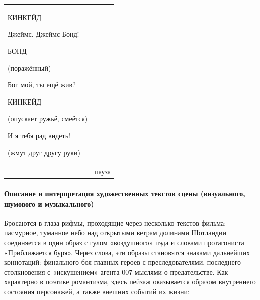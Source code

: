 \begin{center}
\begin{longtable}{|p{}|p{}|}
\begin{center}КИНКЕЙД\end{center} \newline
Джеймс. Джеймс Бонд! \newline
\begin{center}БОНД\end{center} \newline
\begin{center}(поражённый)\end{center} \newline
Бог мой, ты ещё жив? \newline
\begin{center}КИНКЕЙД\end{center} \newline
\begin{center}(опускает ружьё, смеётся)\end{center} \newline
И я тебя рад видеть! \newline
\begin{center}(жмут друг другу руки)\end{center} \newline

\\

& пауза
\\
\hline
  \end{longtable}
\end{center}

\paragraph{Описание и интерпретация художественных текстов сцены (визуального, шумового и музыкального)}\label{ux43eux43fux438ux441ux430ux43dux438ux435-ux438-ux438ux43dux442ux435ux440ux43fux440ux435ux442ux430ux446ux438ux44f-ux445ux443ux434ux43eux436ux435ux441ux442ux432ux435ux43dux43dux44bux445-ux442ux435ux43aux441ux442ux43eux432-ux441ux446ux435ux43dux44b-ux432ux438ux437ux443ux430ux43bux44cux43dux43eux433ux43e-ux448ux443ux43cux43eux432ux43eux433ux43e-ux438-ux43cux443ux437ux44bux43aux430ux43bux44cux43dux43eux433ux43e-6}

Бросаются в глаза рифмы, проходящие через несколько текстов фильма: пасмурное, туманное небо над открытыми ветрам долинами Шотландии соединяется в один образ с гулом «воздушного» пэда и словами протагониста «Приближается буря».
Через слова, эти образы становятся знаками дальнейших коннотаций: финального боя главных героев с преследователями, последнего столкновения с «искушением» агента 007 мыслями о предательстве.
Как характерно в поэтике романтизма, здесь пейзаж оказывается образом внутреннего состояния персонажей, а также внешних событий их жизни:


